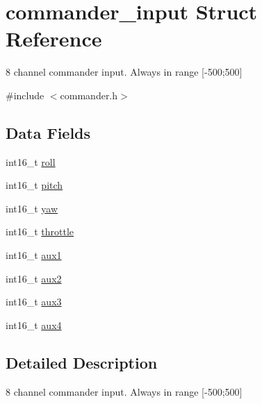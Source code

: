 \hypertarget{structcommander__input}{\section{commander\+\_\+input Struct Reference}
\label{structcommander__input}
}


8 channel commander input. Always in range \mbox{[}-\/500;500\mbox{]}  




{\ttfamily \#include $<$commander.\+h$>$}

\subsection*{Data Fields}
\begin{DoxyCompactItemize}
\item 
int16\+\_\+t \hyperlink{structcommander__input_a445354d0f0424514692cb1c1a4f9743f}{roll}
\item 
int16\+\_\+t \hyperlink{structcommander__input_a9052bfe43c9e65d02850bc579ce700da}{pitch}
\item 
int16\+\_\+t \hyperlink{structcommander__input_a1ce80590f36695999cc0b15f29b8449b}{yaw}
\item 
int16\+\_\+t \hyperlink{structcommander__input_a5b218002b832b58b60029552503a2dc3}{throttle}
\item 
int16\+\_\+t \hyperlink{structcommander__input_a76e4e61d4419ce979d61fbf3ed2b0059}{aux1}
\item 
int16\+\_\+t \hyperlink{structcommander__input_a853140ec6a0d9d8fdcfc432abfd0c9f9}{aux2}
\item 
int16\+\_\+t \hyperlink{structcommander__input_a282d11c1e880cdb04ffb2fa9a40b07a1}{aux3}
\item 
int16\+\_\+t \hyperlink{structcommander__input_a8f9b2d545fad13505f9f2aa5db78903e}{aux4}
\end{DoxyCompactItemize}


\subsection{Detailed Description}
8 channel commander input. Always in range \mbox{[}-\/500;500\mbox{]} 

